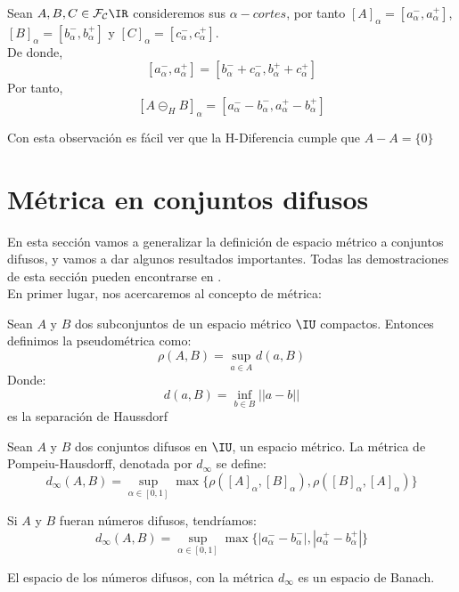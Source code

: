 \begin{observacion}
	Sean $A, B, C \in \mathcal{F}_\mathcal{C}\IR$ consideremos sus $\alpha - cortes$, por tanto $[A]_\alpha = [a^-_\alpha, a^+_\alpha]$, $[B]_\alpha = [b^-_\alpha, b^+_\alpha]$ y $[C]_\alpha = [c^-_\alpha, c^+_\alpha]$. \\
	De donde,
	$$
	[a^-_\alpha, a^+_\alpha] = [b^-_\alpha + c^-_\alpha, b^+_\alpha + c^+_\alpha]
	$$
	Por tanto, 
	$$
	[A \circleddash_H B]_\alpha = [a_\alpha^- - b_\alpha^-, a_\alpha^+ - b_\alpha^+]
	$$
\end{observacion}
Con esta observación es fácil ver que la H-Diferencia cumple que $A-A=\{0\}$

\section{Métrica en conjuntos difusos}
En esta sección vamos a generalizar la definición de espacio métrico a conjuntos difusos, y vamos a dar algunos resultados importantes. Todas las demostraciones de esta sección pueden encontrarse en \cite{apuntesfuzzy}. \\
En primer lugar, nos acercaremos al concepto de métrica:

\begin{definicion}[Pseudométrica]
	Sean $A$ y $B$ dos subconjuntos de un espacio métrico $\IU$ compactos. Entonces definimos la pseudométrica como:
	\[
		\rho(A, B) = \sup\limits_{a \in A} d(a, B)
	\]
	Donde:
	\[
		d(a, B) = \inf\limits_{b \in B} ||a-b||
	\]
	es la separación de Haussdorf
\end{definicion}

\begin{definicion}
	\label{def:metricadifusa}
	Sean $A$ y $B$ dos conjuntos difusos en $\IU$, un espacio métrico. La métrica de Pompeiu-Hausdorff, denotada por $d_\infty$ se define:
	\[
		d_\infty(A, B) = \sup\limits_{\alpha \in [0, 1]} \max\{\rho([A]_\alpha, [B]_\alpha), \rho([B]_\alpha,  [A]_\alpha)\}
	\]
	
	Si $A$ y $B$ fueran números difusos, tendríamos:
	\[
		d_\infty(A, B) = \sup\limits_{\alpha \in [0, 1]} \max\{|a_\alpha^- - b_\alpha^-|, |a_\alpha^+ - b_\alpha^+|\}
	\]
\end{definicion}

\begin{teorema}
	\label{teorema:banach}
	El espacio de los números difusos, con la métrica $d_\infty$ es un espacio de Banach.
\end{teorema}